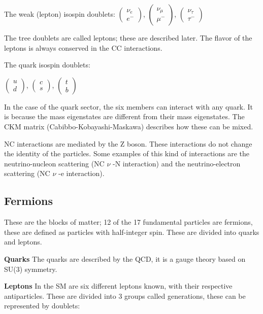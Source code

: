 The weak (lepton) isospin doublets:
$\begin{pmatrix}
    \nu_e \\
    e^-
\end{pmatrix}$, 
$\begin{pmatrix}
    \nu_\mu \\
    \mu^-
\end{pmatrix}$, 
$\begin{pmatrix}
    \nu_\tau \\
    \tau^-
\end{pmatrix}$


The tree doublets are called leptons; these are described later. The flavor of the leptons is always conserved in the CC interactions. 

The quark isospin doublets:

$\begin{pmatrix}
    u \\
    d
\end{pmatrix}$, 
$\begin{pmatrix}
    c \\
    s
\end{pmatrix}$, 
$\begin{pmatrix}
    t \\
    b
\end{pmatrix}$

In the case of the quark sector, the six members can interact with any quark. It is because the mass eigenstates are different from their mass eigenstates. The CKM matrix (Cabibbo-Kobayashi-Maskawa) describes how these can be mixed. 

 NC interactions are mediated by the Z boson. These interactions do not change the identity of the particles. Some examples of this kind of interactions are the neutrino-nucleon scattering (NC $\nu$ -N interaction) and the neutrino-electron scattering (NC $\nu$ -e interaction). 



\subsection{Fermions}
These are the blocks of matter; 12 of the 17 fundamental particles are fermions, these are defined as particles with half-integer spin. These are divided into quarks and leptons. 

\textbf{Quarks}
The quarks are described by the QCD, it is a gauge theory based on SU(3) symmetry.  

\textbf{Leptons}
In the SM are six different leptons known, with their respective antiparticles. These are divided into 3 groups called generations, these can be represented by doublets: 

